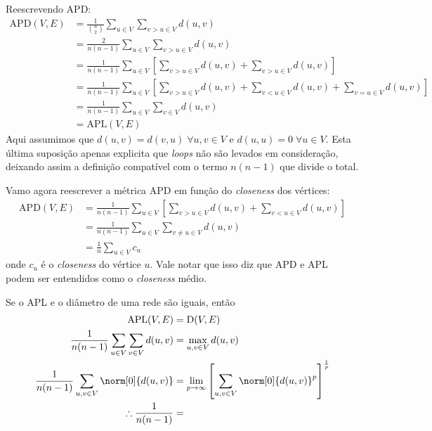 \documentclass[l15, tikzdraw]{homework}
\begin{document}
	\subquest{}%
	Reescrevendo APD:
	\begin{align*}
		\text{APD}(V, E) %
		&= \frac{1}{\binom{n}{2}} \sum_{u \in V} \sum_{v > u \in V} d(u, v)\\[1ex]
		&= \frac{2}{n (n - 1)} \sum_{u \in V} \sum_{v > u \in V} d(u, v)\\[1ex]
		&= \frac{1}{n (n - 1)} \sum_{u \in V} \left[ \sum_{v > u \in V} d(u, v) + \sum_{v > u \in V} d(u, v) \right]\\
		&= \frac{1}{n (n - 1)} \sum_{u \in V} \left[ \sum_{v > u \in V} d(u, v) + \sum_{v < u \in V} d(u, v) + \sum_{v = u \in V} d(u, v)\right]\\
		&= \frac{1}{n (n - 1)} \sum_{u \in V} \sum_{v \in V} d(u, v)\\
		&= \text{APL}(V, E)
	\end{align*}
	Aqui assumimos que $d(u, v) = d(v, u) \;\forall u, v \in V$ e $d(u, u) = 0 \;\forall u \in V$. Esta última suposição apenas explicita que \textit{loops} não são levados em consideração, deixando assim a definição compatível com o termo $n (n - 1)$ que divide o total.\par

	Vamo agora reescrever a métrica APD em função do \textit{closeness} dos vértices:
	\begin{align*}
		\text{APD}(V, E) %
		&= \frac{1}{n (n - 1)} \sum_{u \in V} \left[ \sum_{v > u \in V} d(u, v) + \sum_{v < u \in V} d(u, v) \right]\\
		&= \frac{1}{n (n - 1)} \sum_{u \in V} \sum_{v \neq u \in V} d(u, v) \\
		&= \frac{1}{n} \sum_{u \in V} c_u
	\end{align*}
	onde $c_u$ é o \textit{closeness} do vértice $u$. Vale notar que isso diz que APD e APL podem ser entendidos como o \textit{closeness} médio.

	\subquest{}%
	Se o APL e o diâmetro de uma rede são iguais, então
	\begin{align*}
			\text{APL}(V, E) &= \text{D}(V, E) \\
			\frac{1}{n (n - 1)} \sum_{u \in V} \sum_{v \in V} d(u, v) &= \max_{u, v \in V} d(u, v) \\
			\frac{1}{n (n - 1)} \sum_{u, v \in V} \norm[0]{d(u, v)} &= \lim_{p \to \infty} \left[ \sum_{u, v \in V} \norm[0]{d(u, v)}^p \right]^{\frac{1}{p}} \\
\therefore  \frac{1}{n (n - 1)} &=  
	\end{align*}

	\subquest{} %
\end{document}
